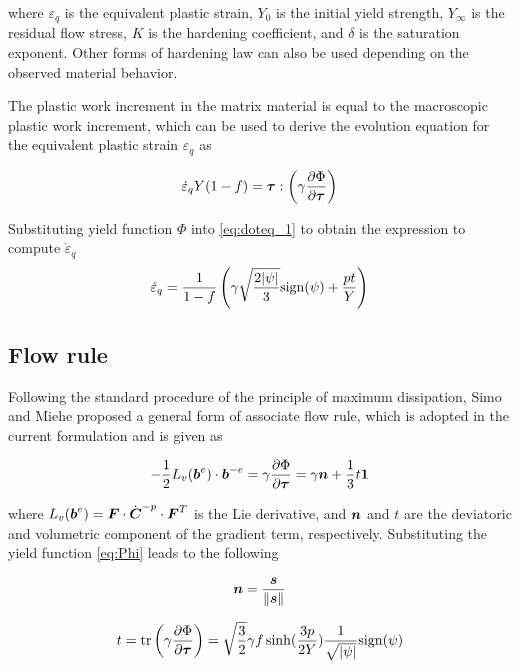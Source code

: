 \documentclass[11pt]{article}
\theoremstyle{remark}
\begin{document}
where $\varepsilon_q$ is the equivalent plastic strain, $Y_0$ is the
initial yield strength, $Y_{\infty}$ is the residual flow stress, $K$
is the hardening coefficient, and $\delta$ is the saturation
exponent. Other forms of hardening law can also be used depending on
the observed material behavior.

The plastic work increment in the matrix material is equal to the
macroscopic plastic work increment, which can be used to derive the
evolution equation for the equivalent plastic strain $\varepsilon_q$
as

\begin{equation}\label{eq:doteq_1}
\dot{\varepsilon}_q Y(1-f) = {\boldsymbol{\tau}} : \left(
\gamma\frac{\partial\Phi}{\partial{\boldsymbol{\tau}}} \right)
\end{equation}

Substituting yield function $\Phi$ into \eqref{eq:doteq_1} to obtain
the expression to compute $\dot{\varepsilon}_q$
\begin{equation}\label{eq:doteq}
  \dot{\varepsilon}_q =\frac{1}{1-f}\left(
  \gamma\sqrt{\frac{2|\psi|}{3}} {\rm sign}(\psi) + \frac{p t}{Y}
  \right)
\end{equation}


\subsection{Flow rule}
Following the standard procedure of the principle of maximum
dissipation, Simo and Miehe \cite{Simo1992} proposed a general form 
of associate flow rule, which is adopted in the current formulation 
and is given as

\begin{equation}\label{eq:flowRule}
-\frac{1}{2}L_v({\boldsymbol{b}}^e)\cdot{\boldsymbol{b}}^{-e} =
\gamma\frac{\partial\Phi}{\partial{\boldsymbol{\tau}}}=\gamma{\boldsymbol{n}} +
\frac{1}{3}t\boldsymbol{1}
\end{equation}

where $L_v({\boldsymbol{b}}^e)={\boldsymbol{F}} \cdot \dot{{\boldsymbol{C}}}^{-p} \cdot {\boldsymbol{F}}^T$ is the Lie
derivative, and ${\boldsymbol{n}}$ and $t$ are the deviatoric and volumetric
component of the gradient term, respectively. Substituting the yield
function \eqref{eq:Phi} leads to the following

\begin{equation}\label{eq:n}
{\boldsymbol{n}} = \frac{{\boldsymbol{s}}}{\|{\boldsymbol{s}}\|}
\end{equation}

\begin{equation}\label{eq:t}
t = \operatorname{\text{tr}} \left( \gamma \frac{\partial\Phi}{\partial{\boldsymbol{\tau}}}\right) =
\sqrt{\frac{3}{2}}\gamma f \sinh (\frac{3p}{2
  Y})\frac{1}{\sqrt{|\psi|}} {\rm sign}(\psi)
\end{equation}
\end{document}
